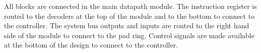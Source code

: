 All blocks are connected in the main datapath module.
The instruction register is routed to the decoders at the top of the module and to the bottom to connect to the controller. 
The system bus outputs and inputs are routed to the right hand side of the module to connect to the pad ring.
Control signals are made available at the bottom of the design to connect to the controller. 

%

